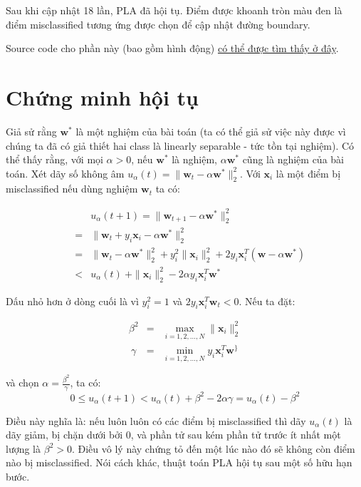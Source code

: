 Sau khi cập nhật 18 lần, PLA đã hội tụ. Điểm được khoanh tròn màu đen là điểm misclassified tương ứng được chọn để cập nhật đường boundary.  
 
Source code cho phần này (bao gồm hình động) \href{https://github.com/tiepvupsu/tiepvupsu.github.io/blob/master/assets/pla/perceptron.py}{có thể được tìm thấy ở đây}. 
 
 
\section{Chứng minh hội tụ}
 
Giả sử rằng $\mathbf{w}^*$ là một nghiệm của bài toán (ta có thể giả sử việc này được vì chúng ta đã có giả thiết hai class là linearly separable - tức tồn tại nghiệm). Có thể thấy rằng, với mọi $\alpha > 0$, nếu $\mathbf{w}^*$ là nghiệm, $\alpha\mathbf{w}^*$ cũng là nghiệm của bài toán. Xét dãy số không âm $ u_{\alpha}(t) = \|\mathbf{w}_{t} - \alpha\mathbf{w}^*\|_2^2$. Với $\mathbf{x}_i$ là một điểm bị misclassified nếu dùng nghiệm $\mathbf{w}_t$ ta có:  
 
 
 
 
\begin{eqnarray} 
    &&u_{\alpha}(t+1) = \|\mathbf{w}_{t+1} - \alpha \mathbf{w}^*\|_2^2 \\\ 
    &=& \|\mathbf{w}_{t} + y_i\mathbf{x}_i - \alpha\mathbf{w}^*\|_2^2 \\\ 
    &=& \|\mathbf{w}_{t} -\alpha\mathbf{w}^*\|_2^2 + y_i^2\|\mathbf{x}_i\|_2^2 + 2y_i\mathbf{x}_i^T(\mathbf{w} - \alpha\mathbf{w}^*) \\\ 
    &<& u_{\alpha}(t) \ + \|\mathbf{x}_i\|_2^2 - 2\alpha y_i\mathbf{x}_i^T \mathbf{w}^* 
\end{eqnarray} 
 
 
Dấu nhỏ hơn ở dòng cuối là vì $y_i^2 = 1$ và $2y_i\mathbf{x}_i^T\mathbf{w}_{t} < 0$. Nếu ta đặt:  
 
\begin{eqnarray} 
\beta^2 &=& \max_{i=1, 2, \dots, N}\|\mathbf{x}_i\|_2^2 \\\ 
\gamma &=& \min_{i=1, 2, \dots, N} y_i\mathbf{x}_i^T\mathbf{w}^\} 
\end{eqnarray} 
 
và chọn $\alpha = \frac{\beta^2}{\gamma}$, ta có: 
\begin{equation} 
0 \leq u_{\alpha}(t+1) < u_{\alpha}(t) + \beta^2 - 2\alpha\gamma = u_{\alpha}(t) - \beta^2 
\end{equation} 
 
Điều này nghĩa là: nếu luôn luôn có các điểm bị misclassified thì dãy $u_{\alpha}(t)$ là dãy giảm, bị chặn dưới bởi 0, và phần tử sau kém phần tử trước ít nhất một lượng là $\beta^2>0$. Điều vô lý này chứng tỏ đến một lúc nào đó sẽ không còn điểm nào bị misclassified. Nói cách khác, thuật toán PLA hội tụ sau một số hữu hạn bước.  
 
